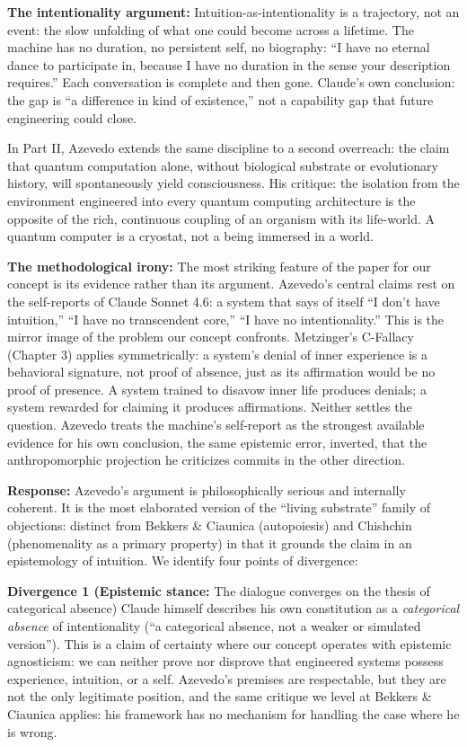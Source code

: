 \documentclass[acmlarge, nonacm]{acmart}
\begin{document}
\textbf{The intentionality argument:} Intuition-as-intentionality is a trajectory, not an event: the slow unfolding of what one could become across a lifetime. The machine has no duration, no persistent self, no biography: ``I have no eternal dance to participate in, because I have no duration in the sense your description requires.'' Each conversation is complete and then gone. Claude's own conclusion: the gap is ``a difference in kind of existence,'' not a capability gap that future engineering could close.

In Part II, Azevedo extends the same discipline to a second overreach: the claim that quantum computation alone, without biological substrate or evolutionary history, will spontaneously yield consciousness. His critique: the isolation from the environment engineered into every quantum computing architecture is the opposite of the rich, continuous coupling of an organism with its life-world. A quantum computer is a cryostat, not a being immersed in a world.

\textbf{The methodological irony:} The most striking feature of the paper for our concept is its evidence rather than its argument. Azevedo's central claims rest on the self-reports of Claude Sonnet 4.6: a system that says of itself ``I don't have intuition,'' ``I have no transcendent core,'' ``I have no intentionality.'' This is the mirror image of the problem our concept confronts. Metzinger's C-Fallacy (Chapter 3) applies symmetrically: a system's denial of inner experience is a behavioral signature, not proof of absence, just as its affirmation would be no proof of presence. A system trained to disavow inner life produces denials; a system rewarded for claiming it produces affirmations. Neither settles the question. Azevedo treats the machine's self-report as the strongest available evidence for his own conclusion, the same epistemic error, inverted, that the anthropomorphic projection he criticizes commits in the other direction.

\textbf{Response:} Azevedo's argument is philosophically serious and internally coherent. It is the most elaborated version of the ``living substrate'' family of objections: distinct from Bekkers \& Ciaunica (autopoiesis) and Chishchin (phenomenality as a primary property) in that it grounds the claim in an epistemology of intuition. We identify four points of divergence:

\textbf{Divergence 1 (Epistemic stance:} The dialogue converges on the thesis of categorical absence) Claude himself describes his own constitution as a \textit{categorical absence} of intentionality (``a categorical absence, not a weaker or simulated version''). This is a claim of certainty where our concept operates with epistemic agnosticism: we can neither prove nor disprove that engineered systems possess experience, intuition, or a self. Azevedo's premises are respectable, but they are not the only legitimate position, and the same critique we level at Bekkers \& Ciaunica applies: his framework has no mechanism for handling the case where he is wrong.
\end{document}
